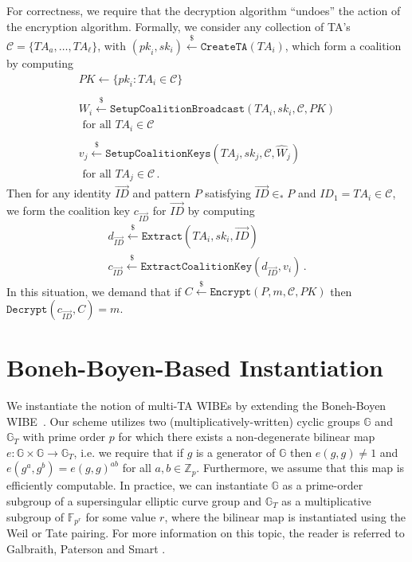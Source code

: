 \documentclass{IEEEtran}
\newcommand{\C}{\mathcal{C}}
\newcommand{\Fbb}{\mathbb{F}}
\newcommand{\Gbb}{\mathbb{G}}
\newcommand{\Zbb}{\mathbb{Z}}
\newcommand{\ID}{\mathit{ID}}
\newcommand{\TA}{\mathit{TA}}
\newcommand{\pk}{\mathit{pk}}
\newcommand{\sk}{\mathit{sk}}
\newcommand{\getsr}{\stackrel{{\scriptscriptstyle\$}}{\gets}}
\begin{document}
For correctness, we require that the decryption algorithm ``undoes''
the action of the encryption algorithm. Formally, we consider any
collection of TA's $\C = \{\TA_{a},\ldots,\TA_{\ell}\}$, with
$(\pk_{i},\sk_{i}) \getsr \texttt{CreateTA}(\TA_{i})$, which form a
coalition by computing
\begin{displaymath}
\begin{array}{c}
PK \gets \{ \pk_{i} : \TA_{i} \in \C\} \\
\\
W_{i} \getsr \texttt{SetupCoalitionBroadcast}(\TA_{i},\sk_{i},\C,
PK)\\
\mbox{ for all } \TA_{i} \in \C\\
\\
v_{j} \getsr \texttt{SetupCoalitionKeys}(\TA_{j},\sk_{j},\C,
\hat{W}_{j})\\
\mbox{ for all } \TA_{j} \in \C \, .
\end{array}
\end{displaymath}
Then for any identity $\vec{\ID}$ and pattern $P$ satisfying
$\vec{\ID} \in_{*} P$ and $\ID_{1} = \TA_{i} \in \C$, we form the
coalition key $c_{\vec{\ID}}$ for $\vec{\ID}$ by computing
\begin{displaymath}
\begin{array}{c}
d_{\vec{\ID}} \getsr \texttt{Extract}(\TA_{i},\sk_{i},\vec{\ID})\\
c_{\vec{\ID}} \getsr \texttt{ExtractCoalitionKey}(d_{\vec{\ID}},v_{i}) \, .
\end{array}
\end{displaymath}
In this situation, we demand that if $C
\getsr \texttt{Encrypt}(P,m,\C,PK)$ then
$\texttt{Decrypt}(c_{\vec{\ID}},C) = m$.

\section{Boneh-Boyen-Based Instantiation}

We instantiate the notion of multi-TA WIBEs by extending the
Boneh-Boyen WIBE~\cite{Abdalla06}. Our scheme utilizes two
(multiplicatively-written) cyclic groups $\Gbb$ and $\Gbb_{T}$ with
prime order $p$ for which there exists a non-degenerate bilinear map
$e : \Gbb \times \Gbb \rightarrow \Gbb_{T}$, i.e. we require that if
$g$ is a generator of $\Gbb$ then $e(g,g) \neq 1$ and
$e(g^{a},g^{b}) = e(g,g)^{ab}$ for all $a,b \in
\Zbb_{p}$. Furthermore, we assume that this map is efficiently
computable. In practice, we can instantiate $\Gbb$ as a prime-order
subgroup of a supersingular elliptic curve group and $\Gbb_{T}$ as a
multiplicative subgroup of $\Fbb_{p^{r}}$ for some value $r$, where
the bilinear map is instantiated using the Weil or Tate pairing. For
more information on this topic, the reader is referred to Galbraith,
Paterson and Smart \cite{Galbraith08}.
\end{document}
